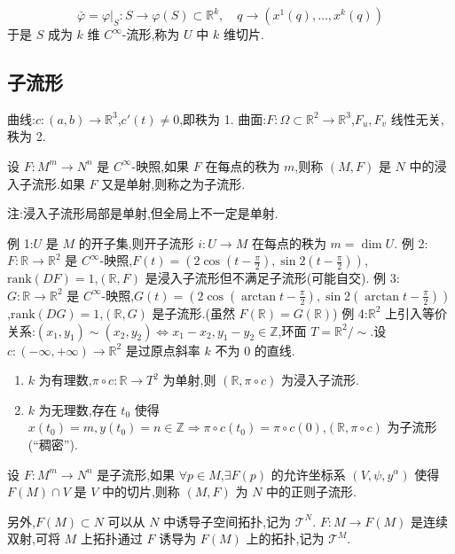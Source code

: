 \[
\bar{\varphi} = \varphi|_S : S \to \varphi(S) \subset \mathbb{R}^k, \quad q \to (x^1(q), \ldots, x^k(q))
\]
于是 $S$ 成为 $k$ 维 $C^\infty$-流形,称为 $U$ 中 $k$ 维切片.

\subsection{子流形}

曲线:$c:(a,b) \to \mathbb{R}^3$,$c'(t) \neq 0$,即秩为 1.
曲面:$F: \Omega \subset \mathbb{R}^2 \to \mathbb{R}^3$,$F_u, F_v$ 线性无关,秩为 2.

\begin{definition}
设 $F: M^m \to N^n$ 是 $C^\infty$-映照,如果 $F$ 在每点的秩为 $m$,则称 $(M,F)$ 是 $N$ 中的浸入子流形.如果 $F$ 又是单射,则称之为子流形.
\end{definition}

注:浸入子流形局部是单射,但全局上不一定是单射.

例 1:$U$ 是 $M$ 的开子集,则开子流形 $i: U \to M$ 在每点的秩为 $m = \dim U$.
例 2:$F: \mathbb{R} \to \mathbb{R}^2$ 是 $C^\infty$-映照,$F(t) = (2\cos(t - \frac{\pi}{2}), \sin2(t - \frac{\pi}{2}))$,$\text{rank}(DF) = 1$,$(\mathbb{R},F)$ 是浸入子流形但不满足子流形(可能自交).
例 3:$G: \mathbb{R} \to \mathbb{R}^2$ 是 $C^\infty$-映照,$G(t) = (2\cos(\arctan t - \frac{\pi}{2}), \sin2(\arctan t - \frac{\pi}{2}))$,$\text{rank}(DG) = 1$,$(\mathbb{R},G)$ 是子流形.(虽然 $F(\mathbb{R}) = G(\mathbb{R})$)
例 4:$\mathbb{R}^2$ 上引入等价关系:$(x_1, y_1) \sim (x_2, y_2) \Longleftrightarrow x_1 - x_2, y_1 - y_2 \in \mathbb{Z}$,环面 $T = \mathbb{R}^2 / \sim$.设 $c: (-\infty, +\infty) \to \mathbb{R}^2$ 是过原点斜率 $k$ 不为 0 的直线.
\begin{enumerate}
    \item $k$ 为有理数,$\pi \circ c : \mathbb{R} \to T^2$ 为单射,则 $(\mathbb{R}, \pi \circ c)$ 为浸入子流形.
    \item $k$ 为无理数,存在 $t_0$ 使得 $x(t_0) = m, y(t_0) = n \in \mathbb{Z} \Rightarrow \pi \circ c(t_0) = \pi \circ c(0)$,$(\mathbb{R}, \pi \circ c)$ 为子流形(“稠密”).
\end{enumerate}

\begin{definition}
设 $F : M^m \to N^n$ 是子流形,如果 $\forall p \in M$,$\exists F(p)$ 的允许坐标系 $(V, \psi, y^\alpha)$ 使得 $F(M) \cap V$ 是 $V$ 中的切片,则称 $(M, F)$ 为 $N$ 中的正则子流形.
\end{definition}

另外,$F(M) \subset N$ 可以从 $N$ 中诱导子空间拓扑,记为 $\mathcal{T}^N$.
$F : M \to F(M)$ 是连续双射,可将 $M$ 上拓扑通过 $F$ 诱导为 $F(M)$ 上的拓扑,记为 $\mathcal{T}^M$.


